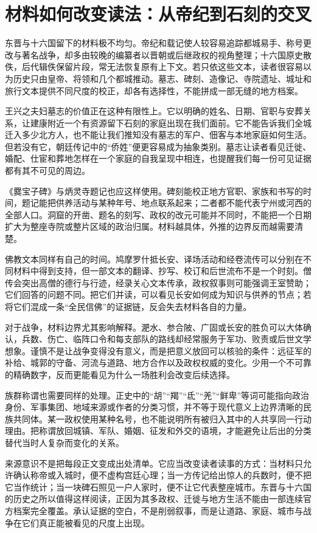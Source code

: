 \section{材料如何改变读法：从帝纪到石刻的交叉}
\label{sec:eastern-jin-depth-evidence}

东晋与十六国留下的材料极不均匀。帝纪和载记使人较容易追踪都城易手、称号更改与著名战争，却多由较晚的编纂者以晋朝或后继政权的视角整理；十六国原史散佚，后代辑佚保留片段，常无法恢复原有上下文。若只依这些文本，读者很容易以为历史只由皇帝、将领和几个都城推动。墓志、碑刻、造像记、寺院遗址、城址和旅行文本提供不同尺度的校正，却各有选择性，不能拼成一部无缝的地方档案。

王兴之夫妇墓志的价值正在这种有限性上。它以明确的姓名、日期、官职与安葬关系，让建康附近一个有资源留下石刻的家庭出现在我们面前。它不能告诉我们全城迁入多少北方人，也不能让我们推知没有墓志的军户、佃客与本地家庭如何生活。但若没有它，朝廷传记中的“侨姓”便更容易成为抽象类别。墓志让读者看见迁徙、婚配、仕宦和葬地怎样在一个家庭的自我呈现中相连，也提醒我们每一份可见证据都有其不可见的周边。

《爨宝子碑》与炳灵寺题记也应这样使用。碑刻能校正地方官职、家族和书写的时间，题记能把供养活动与某种年号、地点联系起来；二者都不能代表宁州或河西的全部人口。洞窟的开凿、题名的刻写、政权的改元可能并不同时，不能把一个日期扩大为整座寺院或整片区域的政治归属。材料越具体，外推的边界反而越需要清楚。

佛教文本同样有自己的时间。鸠摩罗什抵长安、译场活动和经卷流传可以分别在不同材料中得到支持，但一部文本的翻译、抄写、校订和后世流布不是一个时刻。僧传会突出高僧的德行与行迹，经录关心文本传承，政权叙事则可能强调王室赞助；它们回答的问题不同。把它们并读，可以看见长安如何成为知识与供养的节点；若将它们混成一条“全民信佛”的证据链，反会失去材料各自的力量。

对于战争，材料边界尤其影响解释。淝水、参合陂、广固或长安的胜负可以大体确认，兵数、伤亡、临阵口令和每支部队的路线却经常服务于军功、败责或后世文学想象。谨慎不是让战争变得没有意义，而是把意义放回可以核验的条件：远征军的补给、城郭的守备、河流与道路、地方合作以及政权权威的变化。少用一个不可靠的精确数字，反而更能看见为什么一场胜利会改变后续选择。

族群称谓也需要同样的处理。正史中的“胡”“羯”“氐”“羌”“鲜卑”等词可能指向政治身份、军事集团、地域来源或作者的分类习惯，并不等于现代意义上边界清晰的民族共同体。某一政权使用某种名号，也不能说明所有被归入其中的人共享同一行动理由。把称谓放回城镇、军队、婚姻、征发和外交的语境，才能避免让后出的分类替代当时人复杂而变化的关系。

来源意识不是把每段正文变成出处清单。它应当改变读者读事的方式：当材料只允许确认称帝或入城时，便不虚构宫廷心理；当一方传记给出惊人的兵数时，便不把它当作统计；当一块碑石照见一户人家时，便不让它代表整座城市。东晋与十六国的历史之所以值得这样阅读，正因为其多政权、迁徙与地方生活不能由一部连续官方档案完全覆盖。承认证据的空白，不是削弱叙事，而是让道路、家庭、城市与战争在它们真正能被看见的尺度上出现。

